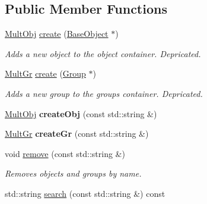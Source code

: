 \subsection*{Public Member Functions}
\begin{DoxyCompactItemize}
\item 
\hypertarget{classMultFS_aacf6a025364bd168fbd6dd37aaa6a152}{\hyperlink{classMultFS_a3862987abee233b7ea08a67abc80b245}{Mult\-Obj} \hyperlink{classMultFS_aacf6a025364bd168fbd6dd37aaa6a152}{create} (\hyperlink{classBaseObject}{Base\-Object} $\ast$)}\label{classMultFS_aacf6a025364bd168fbd6dd37aaa6a152}

\begin{DoxyCompactList}\small\item\em Adds a new object to the object container. Depricated. \end{DoxyCompactList}\item 
\hypertarget{classMultFS_abd99f17847032c1f667843e2bd72c57c}{\hyperlink{classMultFS_a0c5fea8cc8ab29c2624d5863cf75cc6f}{Mult\-Gr} \hyperlink{classMultFS_abd99f17847032c1f667843e2bd72c57c}{create} (\hyperlink{classGroup}{Group} $\ast$)}\label{classMultFS_abd99f17847032c1f667843e2bd72c57c}

\begin{DoxyCompactList}\small\item\em Adds a new group to the groups container. Depricated. \end{DoxyCompactList}\item 
\hypertarget{classMultFS_a96e45921965aa794c03c95d046a0f1b8}{\hyperlink{classMultFS_a3862987abee233b7ea08a67abc80b245}{Mult\-Obj} {\bfseries create\-Obj} (const std\-::string \&)}\label{classMultFS_a96e45921965aa794c03c95d046a0f1b8}

\item 
\hypertarget{classMultFS_a833b6278499d1e187f3828d39b936eaf}{\hyperlink{classMultFS_a0c5fea8cc8ab29c2624d5863cf75cc6f}{Mult\-Gr} {\bfseries create\-Gr} (const std\-::string \&)}\label{classMultFS_a833b6278499d1e187f3828d39b936eaf}

\item 
\hypertarget{classMultFS_a8f223d40df0273ae8eccfc15c8925765}{void \hyperlink{classMultFS_a8f223d40df0273ae8eccfc15c8925765}{remove} (const std\-::string \&)}\label{classMultFS_a8f223d40df0273ae8eccfc15c8925765}

\begin{DoxyCompactList}\small\item\em Removes objects and groups by name. \end{DoxyCompactList}\item 
\hypertarget{classMultFS_a7cee8ae014447fb24cf1efd5a3024101}{std\-::string \hyperlink{classMultFS_a7cee8ae014447fb24cf1efd5a3024101}{search} (const std\-::string \&) const }\label{classMultFS_a7cee8ae014447fb24cf1efd5a3024101}


\end{DoxyCompactItemize}
